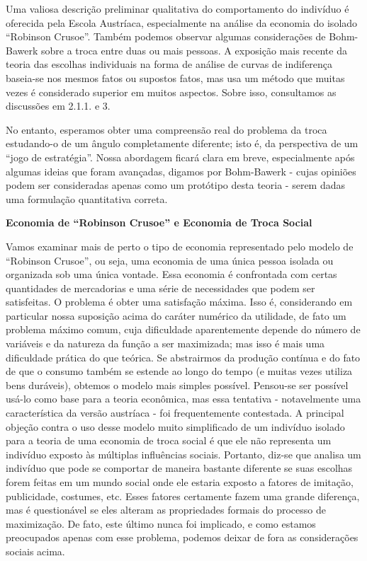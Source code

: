 \documentclass[a4paper,12pt]{article}[abntex2]
\begin{document}
Uma valiosa descrição preliminar qualitativa do comportamento do indivíduo é oferecida pela Escola Austríaca, especialmente na análise da economia do isolado “Robinson Crusoe”. Também podemos observar algumas considerações de Bohm-Bawerk sobre a troca entre duas ou mais pessoas. A exposição mais recente da teoria das escolhas individuais na forma de análise de curvas de indiferença baseia-se nos mesmos fatos ou supostos fatos, mas usa um método que muitas vezes é considerado superior em muitos aspectos. Sobre isso, consultamos as discussões em 2.1.1. e 3.

No entanto, esperamos obter uma compreensão real do problema da troca estudando-o de um ângulo completamente diferente; isto é, da perspectiva de um “jogo de estratégia”. Nossa abordagem ficará clara em breve, especialmente após algumas ideias que foram avançadas, digamos por Bohm-Bawerk - cujas opiniões podem ser consideradas apenas como um protótipo desta teoria - serem dadas uma formulação quantitativa correta.

\textbf{Economia de “Robinson Crusoe” e Economia de Troca Social}

Vamos examinar mais de perto o tipo de economia representado pelo modelo de “Robinson Crusoe”, ou seja, uma economia de uma única pessoa isolada ou organizada sob uma única vontade. Essa economia é confrontada com certas quantidades de mercadorias e uma série de necessidades que podem ser satisfeitas. O problema é obter uma satisfação máxima. Isso é, considerando em particular nossa suposição acima do caráter numérico da utilidade, de fato um problema máximo comum, cuja dificuldade aparentemente depende do número de variáveis e da natureza da função a ser maximizada; mas isso é mais uma dificuldade prática do que teórica. Se abstrairmos da produção contínua e do fato de que o consumo também se estende ao longo do tempo (e muitas vezes utiliza bens duráveis), obtemos o modelo mais simples possível. Pensou-se ser possível usá-lo como base para a teoria econômica, mas essa tentativa - notavelmente uma característica da versão austríaca - foi frequentemente contestada. A principal objeção contra o uso desse modelo muito simplificado de um indivíduo isolado para a teoria de uma economia de troca social é que ele não representa um indivíduo exposto às múltiplas influências sociais. Portanto, diz-se que analisa um indivíduo que pode se comportar de maneira bastante diferente se suas escolhas forem feitas em um mundo social onde ele estaria exposto a fatores de imitação, publicidade, costumes, etc. Esses fatores certamente fazem uma grande diferença, mas é questionável se eles alteram as propriedades formais do processo de maximização. De fato, este último nunca foi implicado, e como estamos preocupados apenas com esse problema, podemos deixar de fora as considerações sociais acima.
\end{document}
